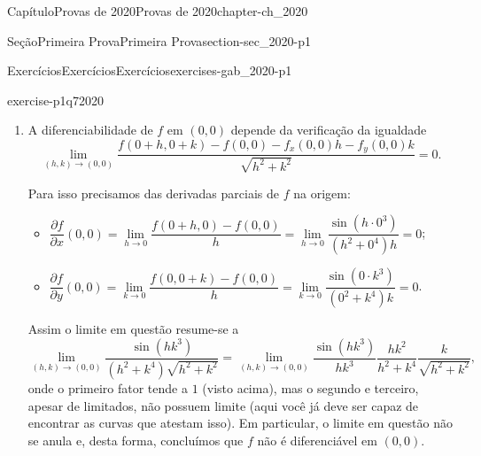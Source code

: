 \documentclass[oneside,10pt,]{book}
\newcommand{\xreffont}{\relax}
\numberwithin{equation}{section}
\begin{document}
\begin{chapterptx}{Capítulo}{Provas de 2020}{}{Provas de 2020}{}{}{chapter-ch_2020}
\begin{sectionptx}{Seção}{Primeira Prova}{}{Primeira Prova}{}{}{section-sec_2020-p1}
\begin{exercises-subsection-numberless}{Exercícios}{Exercícios}{}{Exercícios}{}{}{exercises-gab_2020-p1}
\begin{divisionexercise}{7}{}{}{exercise-p1q72020}
\begin{enumerate}[label=\alph*]
f(x,y)=f(0,0)=0\). Para tanto, se \((x,y)\neq (0,0)\) podemos escrever%
\begin{equation*}
f(x,y)=\dfrac {\sin
(xy^3)}{x^2+y^4}=y\dfrac{xy^2}{x^2+y^4}\dfrac{\sin(xy^3)}{xy^3},
\end{equation*}
onde%
\begin{itemize}[label=\textbullet]
\item{}o primeiro fator tende a zero;%
\item{}o segundo fator é limitado: basta trocar \(y\) por \(y^2\) no exemplo aos 4min 20seg de \hyperref[figure-vid_limitada]{Figura~{\xreffont\ref{figure-vid_limitada}}};%
\item{}o terceiro fator tende a \(1\): aplique a \hyperref[proposition-prop_comp]{Proposição~{\xreffont\ref{proposition-prop_comp}}} com as funções \(f(u)=\begin{cases}\dfrac{\sin u}{u},& u\neq 0\\ \hfill
1,& u=0\end{cases}\) e \(g(x,y)=xy^3\).%
\end{itemize}
Segue então, do \hyperref[corollary-cor_confronto]{Corolário~{\xreffont\ref{corollary-cor_confronto}}}, a verificação da igualdade incial, garantindo a continuidade de \(f\) na origem.%
\item{}A diferenciabilidade de \(f\) em \((0,0)\) depende da verificação da igualdade%
\begin{equation*}
\lim \limits _{(h,k)
\to (0,0)}
\dfrac{f(0+h,0+k)-f(0,0)-f_x(0,0)h-f_y(0,0)k}{\sqrt{h^2+k^2}}=0.
\end{equation*}
%
\par
Para isso precisamos das derivadas parciais de \(f\) na origem:%
\begin{itemize}[label=\textbullet]
\item{}\(\dfrac {\partial f}{\partial x}(0,0)=\lim\limits_{h\to
0}\dfrac{f(0+h,0)-f(0,0)}{h}=\lim\limits_{h\to
0}\dfrac{\sin(h\cdot 0^3)}{(h^2+0^4)h}=0\);%
\item{}\(\dfrac {\partial f}{\partial y}(0,0)=\lim\limits_{k\to
0}\dfrac{f(0,0+k)-f(0,0)}{h}=\lim\limits_{k\to
0}\dfrac{\sin(0\cdot k^3)}{(0^2+k^4)k}=0\).%
\end{itemize}
Assim o limite em questão resume-se a%
\begin{equation*}
\lim \limits _{(h,k)
\to (0,0)}
\dfrac{\sin(hk^3)}{(h^2+k^4)\sqrt{h^2+k^2}}=\lim \limits _{(h,k)
\to (0,0)}
\dfrac{\sin(hk^3)}{hk^3}\dfrac{hk^2}{h^2+k^4}\dfrac{k}{\sqrt{h^2+k^2}},
\end{equation*}
onde o primeiro fator tende a \(1\) (visto acima), mas o segundo e terceiro, apesar de limitados, não possuem limite (aqui você já deve ser capaz de encontrar as curvas que atestam isso). Em particular, o limite em questão não se anula e, desta forma, concluímos que \(f\) não é diferenciável em \((0,0)\).%

\end{enumerate}
\end{divisionexercise}
\end{exercises-subsection-numberless}
\end{sectionptx}
\end{chapterptx}
\end{document}
